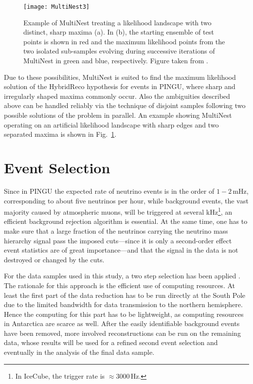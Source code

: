 \begin{figure}[ht]
 \centering
 \texttt{[image: MultiNest3]}
\caption{Example of MultiNest treating a likelihood landscape with two
  distinct, sharp maxima (a). In (b), the starting ensemble of test points is
  shown in red and the maximum likelihood points from the two isolated
  sub-samples evolving during successive iterations of MultiNest in green and
  blue, respectively. Figure taken from \cite{MultiNest1}.}
\label{fig:MultiNest_result}
\end{figure}

Due to these possibilities, MultiNest is suited to find the maximum likelihood
solution of the HybridReco hypothesis for events in PINGU, where sharp and
irregularly shaped maxima commonly occur. Also the ambiguities described above
can be handled reliably via the technique of disjoint samples following two
possible solutions of the problem in parallel. An example showing MultiNest
operating on an artificial likelihood landscape with sharp edges and two
separated maxima is shown in Fig.~\ref{fig:MultiNest_result}.

\section{Event Selection}
\label{sec:EvtSel}

Since in PINGU the expected rate of neutrino events is in the order of $1 -
2$\,mHz, corresponding to about five neutrinos per hour, while background
events, the vast majority caused by atmospheric muons, will be triggered at
several kHz\footnote{In IceCube, the trigger rate is $\approx 3000$\,Hz.}, an
efficient background rejection algorithm is essential. At the same time, one
has to make sure that a large fraction of the neutrinos carrying the neutrino
mass hierarchy signal pass the imposed cuts---since it is only a second-order
effect event statistics are of great importance---and that the signal in the
data is not destroyed or changed by the cuts.

For the data samples used in this study, a two step selection has been applied
\cite{Processing}. The rationale for this approach is the efficient use of
computing resources. At least the first part of the data reduction has to be run
directly at the South Pole due to the limited bandwidth for data transmission to
the northern hemisphere. Hence the computing for this part has to be
lightweight, as computing resources in Antarctica are scarce as well. After the
easily identifiable background events have been removed, more involved
reconstructions can be run on the remaining data, whose results will be used for
a refined second event selection and eventually in the analysis of the final
data sample.

